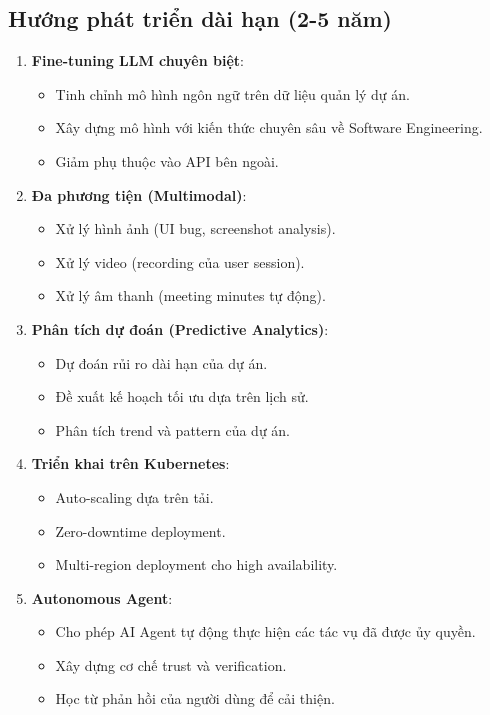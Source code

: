 \documentclass[12pt,a4paper]{report}
\begin{document}
\subsection{Hướng phát triển dài hạn (2-5 năm)}

\begin{enumerate}
\item \textbf{Fine-tuning LLM chuyên biệt}:
\begin{itemize}
\item Tinh chỉnh mô hình ngôn ngữ trên dữ liệu quản lý dự án.
\item Xây dựng mô hình với kiến thức chuyên sâu về Software Engineering.
\item Giảm phụ thuộc vào API bên ngoài.
\end{itemize}

\item \textbf{Đa phương tiện (Multimodal)}:
\begin{itemize}
\item Xử lý hình ảnh (UI bug, screenshot analysis).
\item Xử lý video (recording của user session).
\item Xử lý âm thanh (meeting minutes tự động).
\end{itemize}

\item \textbf{Phân tích dự đoán (Predictive Analytics)}:
\begin{itemize}
\item Dự đoán rủi ro dài hạn của dự án.
\item Đề xuất kế hoạch tối ưu dựa trên lịch sử.
\item Phân tích trend và pattern của dự án.
\end{itemize}

\item \textbf{Triển khai trên Kubernetes}:
\begin{itemize}
\item Auto-scaling dựa trên tải.
\item Zero-downtime deployment.
\item Multi-region deployment cho high availability.
\end{itemize}

\item \textbf{Autonomous Agent}:
\begin{itemize}
\item Cho phép AI Agent tự động thực hiện các tác vụ đã được ủy quyền.
\item Xây dựng cơ chế trust và verification.
\item Học từ phản hồi của người dùng để cải thiện.
\end{itemize}
\end{enumerate}
\end{document}
